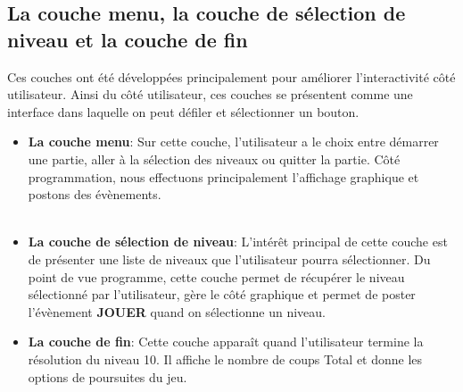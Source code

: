 \documentclass[a4paper,12pt]{article} %
\begin{document}
\subsection{La couche menu, la couche de sélection de niveau et la couche de fin}

Ces couches ont été développées principalement pour améliorer l'interactivité côté utilisateur. Ainsi du côté utilisateur, ces couches se présentent comme une
interface dans laquelle on peut défiler et sélectionner un bouton.
\begin{itemize}
	\item \textbf{La couche menu}: Sur cette couche, l'utilisateur a le choix entre démarrer une partie, aller à la sélection des niveaux ou quitter la partie. Côté programmation, nous effectuons principalement l'affichage graphique et postons des évènements.
	\\
	\\
	\item \textbf{La couche de sélection de niveau}: L'intérêt principal de cette couche est de présenter une liste de niveaux que l'utilisateur pourra sélectionner. Du point de vue programme, cette couche permet de récupérer le niveau sélectionné par l'utilisateur, gère le côté graphique et permet de poster l'évènement \textbf{JOUER} quand on sélectionne un niveau.
	\item \textbf{La couche de fin}: Cette couche apparaît quand l'utilisateur termine la résolution du niveau 10. Il affiche le nombre de coups Total et donne les options de poursuites du jeu.
\end{itemize}
\end{document}
